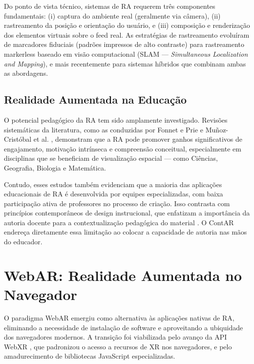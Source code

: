 \documentclass[
  12pt,
  openright,
  twoside,
  a4paper,
  english,
  brazil
]{abntex2}
\begin{document}
Do ponto de vista técnico, sistemas de RA requerem três componentes
fundamentais: (i) captura do ambiente real (geralmente via câmera),
(ii) rastreamento da posição e orientação do usuário, e
(iii) composição e renderização dos elementos virtuais sobre o feed real.
As estratégias de rastreamento evoluíram de marcadores fiduciais
(padrões impressos de alto contraste) para rastreamento markerless baseado
em visão computacional (SLAM — \textit{Simultaneous Localization and Mapping}),
e mais recentemente para sistemas híbridos que combinam ambas as abordagens.

\subsection{Realidade Aumentada na Educação}
\label{subsec:ra-educacao}

O potencial pedagógico da RA tem sido amplamente investigado. Revisões
sistemáticas da literatura, como as conduzidas por Fonnet e Prie
\cite{fonnet2021review} e Muñoz-Cristóbal et al. \cite{munoz2021education},
demonstram que a RA pode promover ganhos significativos de engajamento,
motivação intrínseca e compreensão conceitual, especialmente em disciplinas
que se beneficiam de visualização espacial — como Ciências, Geografia,
Biologia e Matemática.

Contudo, esses estudos também evidenciam que a maioria das aplicações
educacionais de RA é desenvolvida por equipes especializadas, com baixa
participação ativa de professores no processo de criação. Isso contrasta
com princípios contemporâneos de design instrucional, que enfatizam a
importância da autoria docente para a contextualização pedagógica do
material \cite{ruiz2020arbeginner}. O ContAR endereça diretamente essa
limitação ao colocar a capacidade de autoria nas mãos do educador.

\section{WebAR: Realidade Aumentada no Navegador}
\label{sec:webar}

O paradigma WebAR emergiu como alternativa às aplicações nativas de RA,
eliminando a necessidade de instalação de software e aproveitando a
ubiquidade dos navegadores modernos. A transição foi viabilizada pelo
avanço da API WebXR \cite{webxr2020}, que padronizou o acesso a recursos
de XR nos navegadores, e pelo amadurecimento de bibliotecas JavaScript
especializadas.
\end{document}

